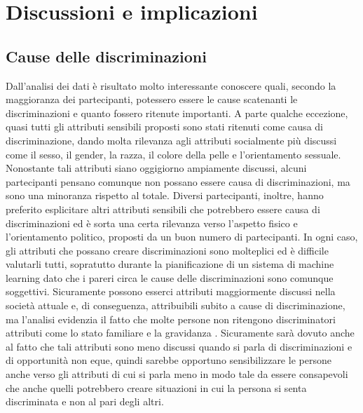 \section{Discussioni e implicazioni}
\subsection{Cause delle discriminazioni}
Dall'analisi dei dati è risultato molto interessante conoscere quali, secondo la maggioranza dei partecipanti, potessero essere le cause scatenanti le discriminazioni e quanto fossero ritenute importanti. A parte qualche eccezione, quasi tutti gli attributi sensibili proposti sono stati ritenuti come causa di discriminazione, dando molta rilevanza agli attributi socialmente più discussi come il sesso, il gender, la razza, il colore della pelle e l'orientamento sessuale. Nonostante tali attributi siano oggigiorno ampiamente discussi, alcuni partecipanti pensano comunque non possano essere causa di discriminazioni, ma sono una minoranza rispetto al totale. Diversi partecipanti, inoltre, hanno preferito esplicitare altri attributi sensibili che potrebbero essere causa di discriminazioni ed è sorta una certa rilevanza verso l'aspetto fisico e l'orientamento politico, proposti da un buon numero di partecipanti. In ogni caso, gli attributi che possano creare discriminazioni sono molteplici ed è difficile valutarli tutti, sopratutto durante la pianificazione di un sistema di machine learning dato che i pareri circa le cause delle discriminazioni sono comunque soggettivi. Sicuramente possono esserci attributi maggiormente discussi nella società attuale e, di conseguenza, attribuibili subito a cause di discriminazione, ma l'analisi evidenzia il fatto che molte persone non ritengono discriminatori attributi come lo stato familiare \cite{familial-status-disc} e la gravidanza \cite{pregnancy-disc}. Sicuramente sarà dovuto anche al fatto che tali attributi sono meno discussi quando si parla di discriminazioni e di opportunità non eque, quindi sarebbe opportuno sensibilizzare le persone anche verso gli attributi di cui si parla meno in modo tale da essere consapevoli che anche quelli potrebbero creare situazioni in cui la persona si senta discriminata e non al pari degli altri.\\
